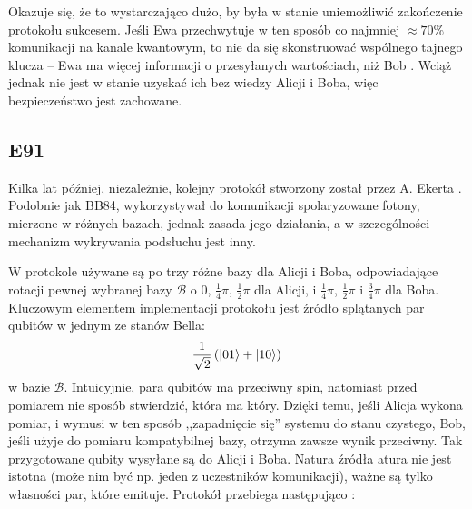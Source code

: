 \documentclass[10pt]{article}
\begin{document}
Okazuje się, że to wystarczająco dużo, by była w stanie uniemożliwić zakończenie protokołu sukcesem.
Jeśli Ewa przechwytuje w ten sposób co najmniej \(\approx 70\%\) komunikacji na kanale kwantowym, to 
nie da się skonstruować wspólnego tajnego klucza -- Ewa ma więcej informacji o przesyłanych wartościach, 
niż Bob \cite{Csiszar78,Scarani09}. Wciąż jednak nie jest w stanie uzyskać ich bez wiedzy Alicji
i Boba, więc bezpieczeństwo jest zachowane.

\subsection{E91}

Kilka lat później, niezależnie, kolejny protokół stworzony został przez A. Ekerta \cite{Ekert91,Ekert12}.
Podobnie jak BB84, wykorzystywał do komunikacji spolaryzowane fotony, mierzone w różnych bazach,
jednak zasada jego działania, a w szczególności mechanizm wykrywania podsłuchu jest inny.

W protokole używane są po trzy różne bazy dla Alicji i Boba, odpowiadające rotacji pewnej wybranej
bazy \(\mathcal{B}\) o \(0\), \(\frac{1}{4}\pi\), \(\frac{1}{2}\pi\) dla Alicji, i \(\frac{1}{4}\pi\), 
\(\frac{1}{2}\pi\) i \(\frac{3}{4}\pi\) dla Boba. Kluczowym elementem implementacji protokołu jest 
źródło splątanych par qubitów w jednym ze stanów Bella:
\[
\frac{1}{\sqrt{2}}\left(\Ket{01}+\Ket{10}\right)
\]
w bazie \(\mathcal{B}\). Intuicyjnie, para qubitów ma przeciwny spin, natomiast przed pomiarem nie 
sposób stwierdzić, która ma który. Dzięki temu, jeśli Alicja wykona pomiar, i wymusi w ten sposób 
,,zapadnięcie się'' systemu do stanu czystego, Bob, jeśli użyje do pomiaru kompatybilnej bazy, otrzyma
zawsze wynik przeciwny. Tak przygotowane qubity wysyłane są do Alicji i Boba. Natura źródła atura nie 
jest  istotna (może nim być np. jeden z uczestników komunikacji), ważne są tylko własności par, które
emituje. Protokół przebiega następująco \cite{Ilic07}:
\end{document}
